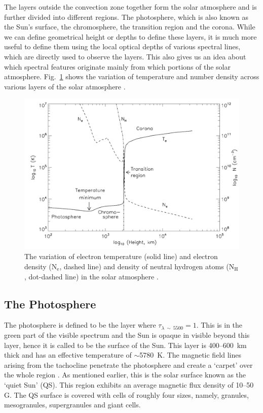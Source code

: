 The layers outside the convection zone together form the solar atmosphere and is further divided into different regions. The photosphere, which is also known as the Sun's surface, the chromosphere, the transition region and the corona. While we can define geometrical height or depths to define these layers, it is much more useful to define them using the local optical depths of various spectral lines, which are directly used to observe the layers. This also gives us an idea about which spectral features originate mainly from which portions of the solar atmosphere. Fig.~\ref{fig_solar_atm} shows the variation of temperature and number density across various layers of the solar atmosphere \citep{philips08}. 

\begin{figure}[ht!]
    \centering
    \includegraphics[width = 0.8\linewidth]{Figures/solar_atm.png}
    \caption[Density and temperature profiles across various layers of the Sun.]{The variation of electron temperature (solid line) and electron density ($\mathrm{N_{e}}$, dashed line) and density of neutral hydrogen atoms ($\mathrm{N_{H}}$, dot-dashed line) in the solar atmosphere \citep{philips08}.}
    \label{fig_solar_atm}
\end{figure}

\subsection{The Photosphere}\label{photosphere}

The photosphere is defined to be the layer where $\tau_{\lambda~\sim~5500}=1$. This is in the green part of the visible spectrum and the Sun is opaque in visible beyond this layer, hence it is called to be the surface of the Sun. This layer is 400{--}600~km thick and has an effective temperature of $\sim$5780~K. The magnetic field lines arising from the tachocline penetrate the photosphere and create a `carpet' over the whole region \citep{priest14}. As mentioned earlier, this is the solar surface known as the `quiet Sun' (QS). This region exhibits an average magnetic flux density of 10{--}50 G. The QS surface is covered with cells of roughly four sizes, namely, granules, mesogranules, supergranules and giant cells.

